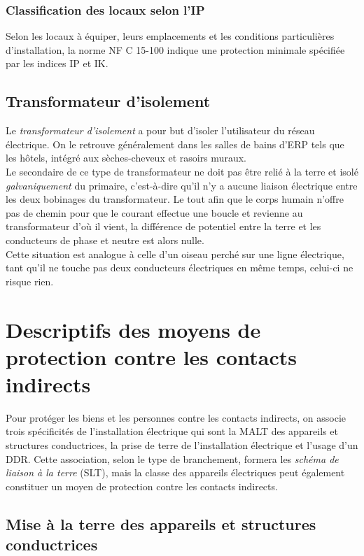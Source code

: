\newpage
\begin{landscape}
\newpage



\newpage
\end{landscape}
\newpage

\subsubsection{Classification des locaux selon l'IP}

Selon les locaux à équiper, leurs emplacements et les conditions particulières d'installation, la norme NF C 15-100 indique une protection minimale spécifiée par les indices IP et IK.



\subsection{Transformateur d'isolement\label{subsec:tranformateur_isolement}}

Le \emph{transformateur d'isolement} a pour but d'isoler l'utilisateur du réseau électrique. On le retrouve généralement dans les salles de bains d'ERP tels que les hôtels, intégré aux sèches-cheveux et rasoirs muraux.\\ 



Le secondaire de ce type de transformateur ne doit pas être relié à la terre et isolé \emph{galvaniquement} du primaire, c'est-à-dire qu'il n'y a aucune liaison électrique entre les deux bobinages du transformateur. Le tout afin que le corps humain n'offre pas de chemin pour que le courant effectue une boucle et revienne au transformateur d'où il vient, la différence de potentiel entre la terre et les conducteurs de phase et neutre est alors nulle.\\Cette situation est analogue à celle d'un oiseau perché sur une ligne électrique, tant qu'il ne touche pas deux conducteurs électriques en même temps,  celui-ci ne risque rien.

\section{Descriptifs des moyens de protection contre les contacts indirects\label{sec:moyens_protection_contacts_indirects}}

Pour protéger les biens et les personnes contre les contacts indirects, on associe trois spécificités de l'installation électrique qui sont la MALT des appareils et structures conductrices, la prise de terre de l'installation électrique et l'usage d'un DDR. Cette association, selon le type de branchement, formera les \emph{schéma de liaison à la terre} (SLT), mais la classe des appareils électriques peut également constituer un moyen de protection contre les contacts indirects.

\subsection{Mise à la terre des appareils et structures conductrices}



%
